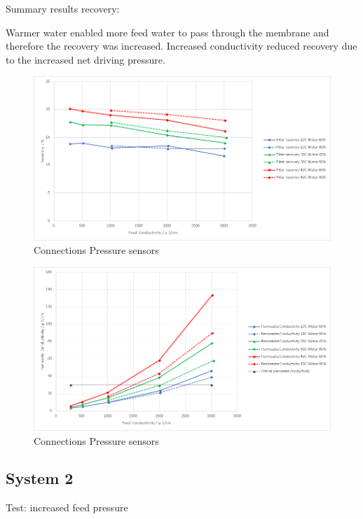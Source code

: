 Summary results recovery:

Warmer water enabled more feed water to pass through the membrane and therefore the recovery was increased. Increased conductivity reduced recovery due to the increased net driving pressure. 

\begin{figure}[H]
    \centering
    \includegraphics[width=1.1\textwidth]{Recovery}
    \caption{Connections Pressure sensors}
    \label{fig:PressConn}
\end{figure}


\begin{figure}[H]
    \centering
    \includegraphics[width=1.1\textwidth]{PermCond}
    \caption{Connections Pressure sensors}
    \label{fig:PressConn}
\end{figure}





\subsection{System 2}

Test: increased feed pressure

